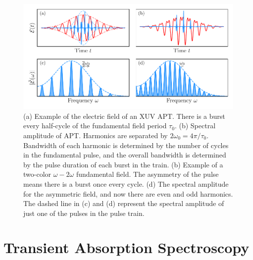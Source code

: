 \begin{figure}
	\centering
	\includegraphics[width=1.0\textwidth]{figures/Introduction/time_to_freq.pdf}
	\caption[Example electric field of XUV APT and its frequency spectrum]{(a) Example of the electric field of an XUV APT.  There is a burst every half-cycle of the fundamental field period $\tau_0$.  (b)  Spectral amplitude of APT.  Harmonics are separated by $2\omega_0=4\pi/\tau_0$.  Bandwidth of each harmonic is determined by the number of cycles in the fundamental pulse, and the overall bandwidth is determined by the pulse duration of each burst in the train. (b) Example of a two-color $\omega-2\omega$ fundamental field.  The asymmetry of the pulse means there is a burst once every cycle. (d) The spectral amplitude for the asymmetric field, and now there are even and odd harmonics.  The dashed line in (c) and (d) represent the spectral amplitude of just one of the pulses in the pulse train.}
	\label{fig:time_to_freq}
\end{figure}


\section{Transient Absorption Spectroscopy}
\label{into_theory_cats}

